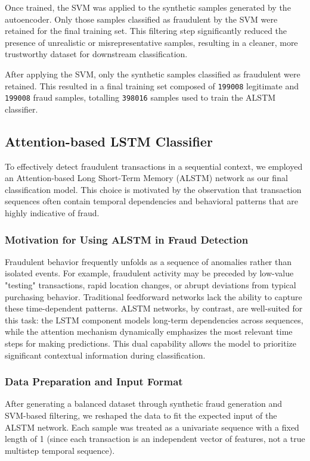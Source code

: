 Once trained, the SVM was applied to the synthetic samples generated by the autoencoder. Only those samples classified as fraudulent by the SVM were retained for the final training set. This filtering step significantly reduced the presence of unrealistic or misrepresentative samples, resulting in a cleaner, more trustworthy dataset for downstream classification.

After applying the SVM, only the synthetic samples classified as fraudulent were retained. This resulted in a final training set composed of \texttt{199008} legitimate and \texttt{199008} fraud samples, totalling \texttt{398016} samples used to train the ALSTM classifier.

\subsection{Attention-based LSTM Classifier}
To effectively detect fraudulent transactions in a sequential context, we employed an Attention-based Long Short-Term Memory (ALSTM) network as our final classification model. This choice is motivated by the observation that transaction sequences often contain temporal dependencies and behavioral patterns that are highly indicative of fraud.

\subsubsection{Motivation for Using ALSTM in Fraud Detection}
Fraudulent behavior frequently unfolds as a sequence of anomalies rather than isolated events. For example, fraudulent activity may be preceded by low-value "testing" transactions, rapid location changes, or abrupt deviations from typical purchasing behavior. Traditional feedforward networks lack the ability to capture these time-dependent patterns. ALSTM networks, by contrast, are well-suited for this task: the LSTM component models long-term dependencies across sequences, while the attention mechanism dynamically emphasizes the most relevant time steps for making predictions. This dual capability allows the model to prioritize significant contextual information during classification.

\subsubsection{Data Preparation and Input Format}
After generating a balanced dataset through synthetic fraud generation and SVM-based filtering, we reshaped the data to fit the expected input of the ALSTM network. Each sample was treated as a univariate sequence with a fixed length of 1 (since each transaction is an independent vector of features, not a true multistep temporal sequence).

